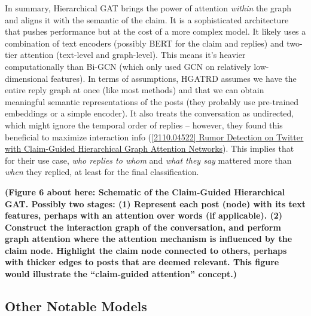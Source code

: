 \documentclass[12pt,a4paper]{report}
\begin{document}
In summary, Hierarchical GAT brings the power of attention \textit{within} the graph and aligns it with the semantic of the claim. It is a sophisticated architecture that pushes performance but at the cost of a more complex model. It likely uses a combination of text encoders (possibly BERT for the claim and replies) and two-tier attention (text-level and graph-level). This means it’s heavier computationally than Bi-GCN (which only used GCN on relatively low-dimensional features). In terms of assumptions, HGATRD assumes we have the entire reply graph at once (like most methods) and that we can obtain meaningful semantic representations of the posts (they probably use pre-trained embeddings or a simple encoder). It also treats the conversation as undirected, which might ignore the temporal order of replies – however, they found this beneficial to maximize interaction info (\href{https://arxiv.org/abs/2110.04522#:~:text=structures%20provide%20valuable%20clues%20to,posts%20that%20can%20semantically%20infer}{[2110.04522] Rumor Detection on Twitter with Claim-Guided Hierarchical Graph Attention Networks}). This implies that for their use case, \textit{who replies to whom} and \textit{what they say} mattered more than \textit{when} they replied, at least for the final classification.

\textbf{(Figure 6 about here: Schematic of the Claim-Guided Hierarchical GAT. Possibly two stages: (1) Represent each post (node) with its text features, perhaps with an attention over words (if applicable). (2) Construct the interaction graph of the conversation, and perform graph attention where the attention mechanism is influenced by the claim node. Highlight the claim node connected to others, perhaps with thicker edges to posts that are deemed relevant. This figure would illustrate the “claim-guided attention” concept.)}

\subsection{Other Notable Models}
\end{document}
